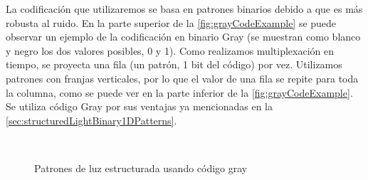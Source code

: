 La codificación que utilizaremos se basa en patrones binarios debido a que es más robusta al ruido. En la parte superior de la \autoref{fig:grayCodeExample} se puede observar un ejemplo de la codificación en binario Gray (se muestran como blanco y negro los dos valores posibles, 0 y 1). Como realizamos multiplexación en tiempo, se proyecta una fila (un patrón, 1 bit del código) por vez. Utilizamos patrones con franjas verticales, por lo que el valor de una fila se repite para toda la columna, como se puede ver en la parte inferior de la \autoref{fig:grayCodeExample}. Se utiliza código Gray por sus ventajas ya mencionadas en la \autoref{sec:structuredLightBinary1DPatterns}.

\begin{figure}[bth]
        \myfloatalign
        \\
        \caption{Patrones de luz estructurada usando código gray}
        \label{fig:grayCodeExample}
\end{figure}


